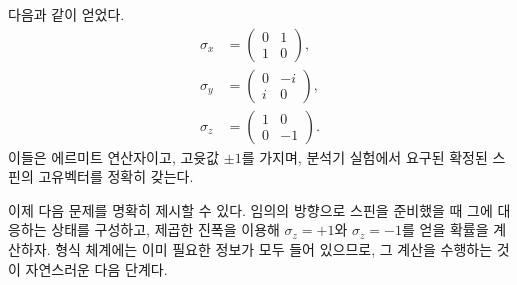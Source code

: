 \begin{classroomqa}\end{classroomqa}

다음과 같이 얻었다.
\begin{equation}
\begin{aligned}
\sigma_x&=\begin{pmatrix}0&1\\1&0\end{pmatrix},\\[0.4em]
\sigma_y&=\begin{pmatrix}0&-i\\i&0\end{pmatrix},\\[0.4em]
\sigma_z&=\begin{pmatrix}1&0\\0&-1\end{pmatrix}.
\end{aligned}
\label{eq:pauli-triple}
\end{equation}
이들은 에르미트 연산자이고, 고윳값 \(\pm1\)를 가지며, 분석기 실험에서 요구된 확정된 스핀의 고유벡터를 정확히 갖는다.

이제 다음 문제를 명확히 제시할 수 있다. 임의의 방향으로 스핀을 준비했을 때 그에 대응하는 상태를 구성하고, 제곱한 진폭을 이용해 \(\sigma_z=+1\)와 \(\sigma_z=-1\)를 얻을 확률을 계산하자. 형식 체계에는 이미 필요한 정보가 모두 들어 있으므로, 그 계산을 수행하는 것이 자연스러운 다음 단계다.
